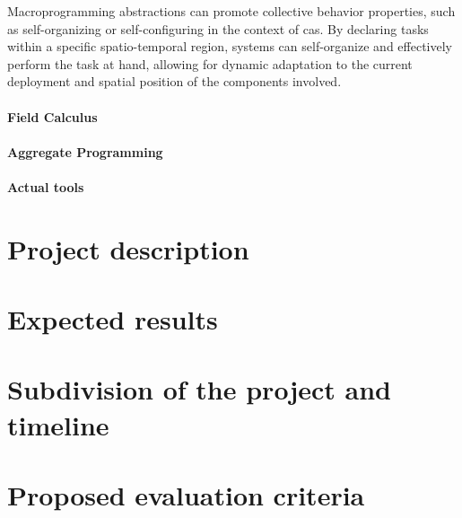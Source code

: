 \documentclass[12pt, a4paper]{article}
\begin{document}
Macroprogramming abstractions can promote collective behavior properties,
such as self-organizing or self-configuring in the context of \ac{cas}.
%
By declaring tasks within a specific spatio-temporal region,
systems can self-organize and effectively perform the task at hand,
allowing for dynamic adaptation to the current deployment and spatial position of the components involved.

\paragraph{Field Calculus}

\paragraph{Aggregate Programming}

\paragraph{Actual tools}


\section{Project description}\label{sec:project-description}


\section{Expected results}\label{sec:expected-results}


\section{Subdivision of the project and timeline}\label{sec:subdivision-of-the-project-and-timeline}


\section{Proposed evaluation criteria}\label{sec:proposed-evaluation-criteria}




\end{document}
